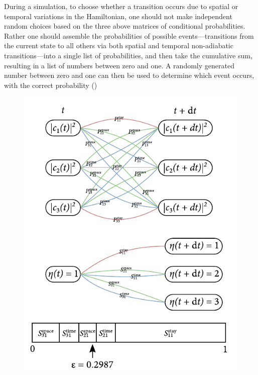 During a simulation, to choose whether a transition occurs due to spatial or temporal variations in the Hamiltonian, one should not make independent random choices based on the three above matrices of conditional probabilities. Rather one should assemble the probabilities of possible events---transitions from the current state to all others via both spatial and temporal non-adiabatic transitions---into a single list of probabilities, and then take the cumulative sum, resulting in a list of numbers between zero and one. A randomly generated number between zero and one can then be used to determine which event occurs, with the correct probability ()

\begin{figure}[t]
    \centerfloat
    \includegraphics{figures/hidden_variables/random_choice.pdf}

\end{figure}
